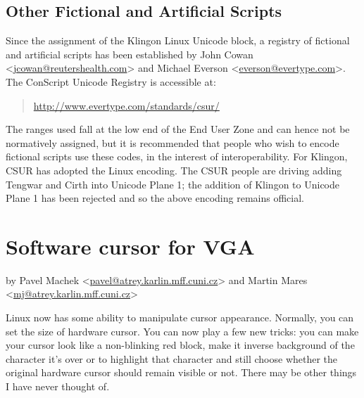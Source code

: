\documentclass[a4paper,8pt,english]{sphinxmanual}
\begin{document}
\section{Other Fictional and Artificial Scripts}
\label{admin-guide/unicode:other-fictional-and-artificial-scripts}
Since the assignment of the Klingon Linux Unicode block, a registry of
fictional and artificial scripts has been established by John Cowan
\textless{}\href{mailto:jcowan@reutershealth.com}{jcowan@reutershealth.com}\textgreater{} and Michael Everson \textless{}\href{mailto:everson@evertype.com}{everson@evertype.com}\textgreater{}.
The ConScript Unicode Registry is accessible at:
\begin{quote}

\href{http://www.evertype.com/standards/csur/}{http://www.evertype.com/standards/csur/}
\end{quote}

The ranges used fall at the low end of the End User Zone and can hence
not be normatively assigned, but it is recommended that people who
wish to encode fictional scripts use these codes, in the interest of
interoperability.  For Klingon, CSUR has adopted the Linux encoding.
The CSUR people are driving adding Tengwar and Cirth into Unicode
Plane 1; the addition of Klingon to Unicode Plane 1 has been rejected
and so the above encoding remains official.


\chapter{Software cursor for VGA}
\label{admin-guide/vga-softcursor:software-cursor-for-vga}\label{admin-guide/vga-softcursor::doc}
by Pavel Machek \textless{}\href{mailto:pavel@atrey.karlin.mff.cuni.cz}{pavel@atrey.karlin.mff.cuni.cz}\textgreater{}
and Martin Mares \textless{}\href{mailto:mj@atrey.karlin.mff.cuni.cz}{mj@atrey.karlin.mff.cuni.cz}\textgreater{}

Linux now has some ability to manipulate cursor appearance.  Normally,
you can set the size of hardware cursor.  You can now play a few new
tricks: you can make your cursor look like a non-blinking red block,
make it inverse background of the character it's over or to highlight
that character and still choose whether the original hardware cursor
should remain visible or not.  There may be other things I have never
thought of.
\end{document}

